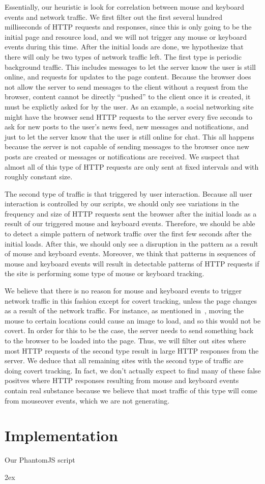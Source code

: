 \documentclass[letterpaper,twocolumn,10pt]{article}
\begin{document}
Essentially, our heuristic is look for correlation between mouse and keyboard events and network traffic. We first filter out the first several hundred milliseconds of HTTP requests and responses, since this is only going to be the initial page and resource load, and we will not trigger any mouse or keyboard events during this time. After the initial loads are done, we hypothesize that there will only be two types of network traffic left. The first type is periodic background traffic. This includes messages to let the server know the user is still online, and requests for updates to the page content. Because the browser does not allow the server to send messages to the client without a request from the browser, content cannot be directly ``pushed'' to the client once it is created, it must be explictly asked for by the user. As an example, a social networking site might have the browser send HTTP requests to the server every five seconds to ask for new posts to the user's news feed, new messages and notifications, and just to let the server know that the user is still online for chat. This all happens because the server is not capable of sending messages to the browser once new posts are created or messages or notifications are received. We suspect that almost all of this type of HTTP requests are only sent at fixed intervals and with roughly constant size.

The second type of traffic is that triggered by user interaction. Because all user interaction is controlled by our scripts, we should only see variations in the frequency and size of HTTP requests sent the browser after the initial loads as a result of our triggered mouse and keyboard events. Therefore, we should be able to detect a simple pattern of network traffic over the first few seconds after the initial loads. After this, we should only see a disruption in the pattern as a result of mouse and keyboard events. Moreover, we think that patterns in sequences of mouse and keyboard events will result in detectable patterns of HTTP requests if the site is performing some type of mouse or keyboard tracking.

We believe that there is no reason for mouse and keyboard events to trigger network traffic in this fashion except for covert tracking, unless the page changes as a result of the network traffic. For instance, as mentioned in~\cite{tainttracking}, moving the mouse to certain locations could cause an image to load, and so this would not be covert. In order for this to be the case, the server needs to send something back to the browser to be loaded into the page. Thus, we will filter out sites where most HTTP requests of the second type result in large HTTP responses from the server. We deduce that all remaining sites with the second type of traffic are doing covert tracking. In fact, we don't actually expect to find many of these false positves where HTTP responses resulting from mouse and keyboard events contain real substance because we believe that most traffic of this type will come from mouseover events, which we are not generating.

\section{Implementation}

Our PhantomJS script 

{\footnotesize 
}


\newpage
\begingroup
\parindent 0pt
\parskip 2ex
\def\enotesize{\normalsize}
\theendnotes
\endgroup
\end{document}
